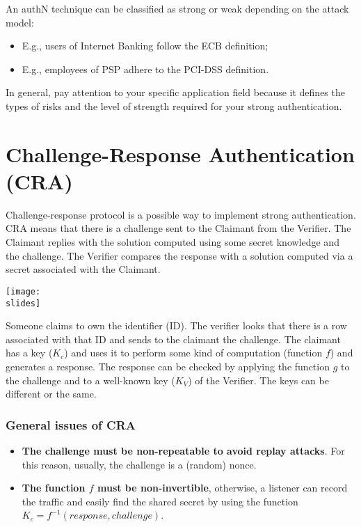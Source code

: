 An authN technique can be classified as strong or weak depending on the attack model:
\begin{itemize}
  \item E.g., users of Internet Banking follow the ECB definition;
  \item E.g., employees of PSP adhere to the PCI-DSS definition.
\end{itemize}

In general, pay attention to your specific application field because it defines the types of risks and the level of strength required for your strong authentication.




\section{Challenge-Response Authentication (CRA)}
Challenge-response protocol is a possible way to implement strong authentication. CRA means that there is a
challenge sent to the Claimant from the Verifier. The Claimant replies with the solution computed using some
secret knowledge and the challenge. The Verifier compares the response with a solution computed via a secret
associated with the Claimant.


\vspace{2mm}
\noindent
\begin{minipage}{0.5\textwidth}
  \centering
  \texttt{[image: \\slides]}
\end{minipage}
\hspace{0.05\textwidth}
\begin{minipage}{0.4\textwidth}
  Someone claims to own the identifier (ID). The verifier looks that there is a row
  associated with that ID and sends to the
  claimant the challenge. The claimant has
  a key (\(K_c\)) and uses it to perform some
  kind of computation (function \(f\)) and
  generates a response. The response can
  be checked by applying the function \(g\) to
  the challenge and to a well-known key (\(K_V\)) of the Verifier. The keys can be different or the same.
\end{minipage}


\subsubsection{General issues of CRA}
\begin{itemize}
  \item \textbf{The challenge must be non-repeatable to avoid replay attacks}. For this reason, usually, the challenge
        is a (random) nonce.
  \item \textbf{The function \(f\) must be non-invertible}, otherwise, a listener can record the traffic and easily find the
        shared secret by using the function \(K_c = f^{-1}(response, challenge)\).
\end{itemize}



